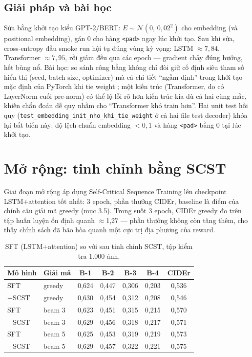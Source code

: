\subsection{Giải pháp và bài học}

Sửa bằng khởi tạo kiểu GPT-2/BERT: $E \sim \mathcal{N}(0,\,0{,}02^2)$ cho
embedding (và positional embedding), gán 0 cho hàng \texttt{<pad>} ngay lúc
khởi tạo. Sau khi sửa, cross-entropy đầu smoke run hội tụ đúng vùng kỳ vọng:
LSTM $\approx 7{,}84$, Transformer $\approx 7{,}95$, rồi giảm đều qua các epoch
--- gradient chảy đúng hướng, hết bùng nổ. Bài học: so sánh công bằng không
chỉ đòi giữ cố định siêu tham số hiển thị (seed, batch size, optimizer) mà cả
chi tiết ``ngầm định'' trong khởi tạo mặc định của PyTorch khi tie weight
\autocite{press2017using}; một kiến trúc (Transformer, do có LayerNorm cuối
pre-norm) có thể lộ lỗi rõ hơn kiến trúc kia dù cả hai cùng mắc, khiến chẩn
đoán dễ quy nhầm cho ``Transformer khó train hơn''. Hai unit test hồi quy
(\texttt{test\_embedding\_init\_nho\_khi\_tie\_weight} ở cả hai file test
decoder) khóa lại bất biến này: độ lệch chuẩn embedding $< 0,1$ và hàng
\texttt{<pad>} bằng 0 tại lúc khởi tạo.

\section{Mở rộng: tinh chỉnh bằng SCST}
\label{sec:scst-results}

Giai đoạn mở rộng áp dụng Self-Critical Sequence Training
\autocite{rennie2017self} lên checkpoint LSTM+attention tốt nhất: 3 epoch,
phần thưởng CIDEr, baseline là điểm của chính câu giải mã greedy (mục 3.5).
Trong suốt 3 epoch, CIDEr greedy đo trên tập huấn luyện ổn định quanh
$\approx$1,27 --- phần thưởng không còn tăng thêm, cho thấy chính sách đã bão
hòa quanh một cực trị địa phương của reward.

\begin{table}[H]
	\centering
	\caption{SFT (LSTM+attention) so với sau tinh chỉnh SCST, tập kiểm tra
	1.000 ảnh.}
	\label{tab:scst}
	\begin{tabular}{llccccc}
		\hline
		\textbf{Mô hình} & \textbf{Giải mã} & \textbf{B-1} & \textbf{B-2} & \textbf{B-3} & \textbf{B-4} & \textbf{CIDEr} \\
		\hline
		SFT   & greedy & 0,624 & 0,447 & 0,306 & 0,203 & 0,536 \\
		+SCST & greedy & 0,630 & 0,454 & 0,312 & 0,208 & 0,546 \\
		\hline
		SFT   & beam 3 & 0,623 & 0,451 & 0,315 & 0,215 & 0,570 \\
		+SCST & beam 3 & 0,629 & 0,456 & 0,318 & 0,217 & 0,571 \\
		\hline
		SFT   & beam 5 & 0,625 & 0,453 & 0,319 & 0,219 & 0,573 \\
		+SCST & beam 5 & 0,629 & 0,457 & 0,322 & 0,221 & 0,575 \\
		\hline
	\end{tabular}
\end{table}

